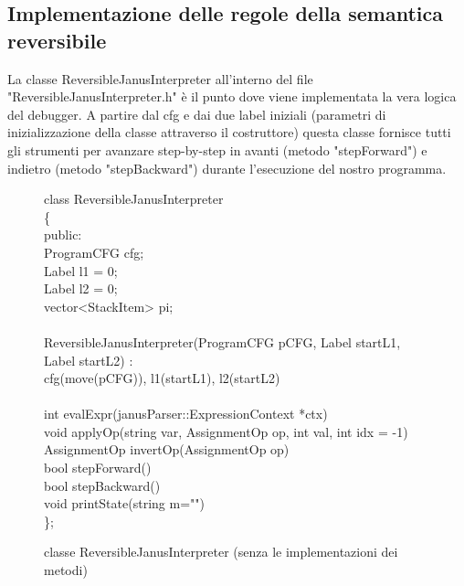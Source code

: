 \documentclass{article}
\theoremstyle{plain}
\theoremstyle{definition}
\theoremstyle{plain}
\begin{document}
\subsection{Implementazione delle regole della semantica reversibile}
La classe ReversibleJanusInterpreter all'interno del file "ReversibleJanusInterpreter.h" è il punto dove viene implementata la vera logica del debugger. A partire dal cfg e dai due label iniziali (parametri di inizializzazione della classe attraverso il costruttore) questa classe fornisce tutti gli strumenti per avanzare step-by-step in avanti (metodo "stepForward") e indietro (metodo "stepBackward") durante l'esecuzione del nostro programma.\bigskip

\begin{figure}[h]
    \centering
    \begin{minipage}{1.2\textwidth}
        \ttfamily 
        class ReversibleJanusInterpreter\\
        \{\\
        public:\\
        \hspace*{1em} ProgramCFG cfg;\\
        \hspace*{1em} Label l1 = 0;\\
        \hspace*{1em} Label l2 = 0;\\
        \hspace*{1em} vector<StackItem> pi;\\
        \\
        \hspace*{1em} ReversibleJanusInterpreter(ProgramCFG pCFG, Label startL1, Label startL2) :\\
        \hspace*{1em} cfg(move(pCFG)), l1(startL1), l2(startL2) {}\\
        \\
        \hspace*{1em} int evalExpr(janusParser::ExpressionContext *ctx)\\
        \hspace*{1em} void applyOp(string var, AssignmentOp op, int val, int idx = -1)\\
        \hspace*{1em} AssignmentOp invertOp(AssignmentOp op)\\
        \hspace*{1em} bool stepForward()\\
        \hspace*{1em} bool stepBackward()\\
        \hspace*{1em} void printState(string m="") \\
        \}; \\
    \end{minipage}
    \caption{classe ReversibleJanusInterpreter (senza le implementazioni dei metodi)}
    \label{fig:reversiblejanusinterpreter}
\end{figure}
\end{document}
